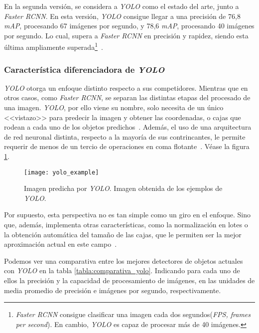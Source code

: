 En la segunda versión, se considera a \textit{YOLO} como el estado del arte, junto a \textit{Faster RCNN}. En esta versión, \textit{YOLO} consigue llegar a una precisión de 76,8 \textit{mAP}, procesando 67 imágenes por segundo, y 78,6 \textit{mAP}, procesando 40 imágenes por segundo. Lo cual, supera a \textit{Faster RCNN} en precisión y rapidez, siendo esta última ampliamente superada\footnote{\textit{Faster RCNN} consigue clasificar una imagen cada dos segundos(\textit{FPS, frames per second}). En cambio, \textit{YOLO} es capaz de procesar más de 40 imágenes.}~\cite{yolov2}.

\subsubsection{Característica diferenciadora de \textit{YOLO}}

\textit{YOLO} otorga un enfoque distinto respecto a sus competidores. Mientras que en otros casos, como \textit{Faster RCNN}, se separan las distintas etapas del procesado de una imagen. \textit{YOLO}, por ello viene su nombre, solo necesita de un único <<vistazo>> para predecir la imagen y obtener las coordenadas, o cajas que rodean a cada uno de los objetos predichos~\cite{yolo}. Además, el uso de una arquitectura de red neuronal distinta, respecto a la mayoría de sus contrincantes, le permite requerir de menos de un tercio de operaciones en coma flotante~\cite{yolov2}. Véase la figura \ref{fig:3.2.14}.

\begin{figure}[h]
\centering
\texttt{[image: yolo\_example]}
\caption[Imagen predicha por \textit{YOLO}]{Imagen predicha por \textit{YOLO}. Imagen obtenida de los ejemplos de \textit{YOLO}.}
\label{fig:3.2.14}
\end{figure}

Por supuesto, esta perspectiva no es tan simple como un giro en el enfoque. Sino que, además, implementa otras características, como la normalización en lotes o la obtención automática del tamaño de las cajas, que le permiten ser la mejor aproximación actual en este campo~\cite{yolov2}.

Podemos ver una comparativa entre los mejores detectores de objetos actuales con \textit{YOLO} en la tabla \ref{tabla:comparativa_yolo}. Indicando para cada uno de ellos la precisión y la capacidad de procesamiento de imágenes, en las unidades de media promedio de precisión e imágenes por segundo, respectivamente.

